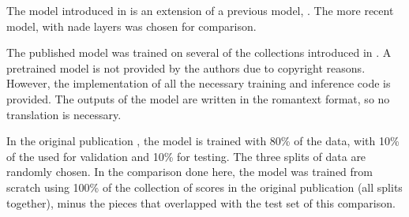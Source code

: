 
The model introduced in \textcite{micchi2021deep} is an
extension of a previous model, \textcite{micchi2020not}. The
more recent model, with \gls{nade} layers was chosen for
comparison.

The published model was trained on several of the
collections introduced in
. A pretrained model
is not provided by the authors due to copyright reasons.
However, the implementation of all the necessary training
and inference code is provided. The outputs of the model are
written in the \gls{romantext} format, so no translation is
necessary. 

In the original publication \parencite{micchi2021deep}, the
model is trained with 80\% of the data, with 10\% of the
used for validation and 10\% for testing. The three splits
of data are randomly chosen. In the comparison done here,
the model was trained from scratch using 100\% of the
collection of scores in the original publication (all splits
together), minus the pieces that overlapped with the test
set of this comparison.
